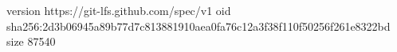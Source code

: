 version https://git-lfs.github.com/spec/v1
oid sha256:2d3b06945a89b77d7c813881910aea0fa76c12a3f38f110f50256f261e8322bd
size 87540
